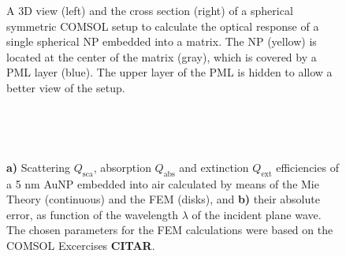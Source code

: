 \begin{figure}[h!]\centering
	\def\svgwidth{.8\textwidth} \small
\vspace*{0em}
\caption[Spherical symmetric COMSOL Setup]{A 3D view (left) and the cross section (right) of a spherical symmetric COMSOL setup to calculate the optical response of a single spherical NP embedded into a matrix. The NP (yellow) is located at the center of the matrix (gray), which is covered by a PML layer (blue). The upper layer of the PML is hidden to allow a better view of the setup.}
\label{fig:setup:sphere}
\end{figure}

\begin{figure}[h!]
\def\svgwidth{\textwidth} \small
\hspace*{-1.25em}
\begin{subfigure}{.1\textwidth}\caption{ }\label{fig:Eff:sphere:First:a}\end{subfigure}
\vspace*{12.5em} %
\\
\vspace*{-16.5em} %
\hspace*{-.75em}%
\begin{subfigure}{.1\textwidth}\caption{ }\label{fig:Eff:sphere:First:b}\end{subfigure}\\
\vspace*{-1.5em} %
\caption[Scattering, Absorption and Extinction Efficiencies of a 5 nm AuNP$@$Air: Analytical and FEM solutions with no optimizatio]{\textbf{a)} Scattering $Q_\text{sca}$, absorption $Q_\text{abs}$ and extinction $Q_\text{ext}$ efficiencies of a 5 nm AuNP embedded into air calculated by means of the Mie Theory (continuous) and the FEM (disks), and \textbf{b)} their absolute error, as function of the wavelength $\lambda$ of the incident plane wave. The chosen parameters for the FEM calculations were based on the COMSOL Excercises \textbf{CITAR}.}
\label{fig:Eff:sphere:First}
\end{figure}
